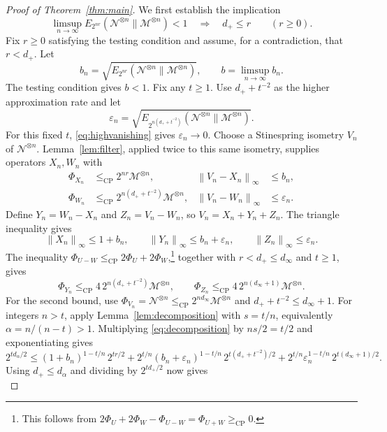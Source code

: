 \documentclass[11pt,letterpaper]{article}
\numberwithin{equation}{section}
\newcommand{\N}{\mathcal N}
\newcommand{\M}{\mathcal M}
\newcommand{\cp}{\mathrm{CP}}
\newcommand{\norm}[1]{\left\lVert#1\right\rVert}
\begin{document}
\begin{proof}[Proof of Theorem~\ref{thm:main}]
We first establish the implication
\begin{equation}\label{eq:thresholdcriterion}
 \limsup_{n\to\infty}E_{2^{nr}}(\N^{\otimes n}\|\M^{\otimes n})<1
 \quad\Longrightarrow\quad d_+\le r\qquad(r\ge0).
\end{equation}
Fix $r\ge0$ satisfying the testing condition and assume, for a contradiction, that $r<d_+$. Let
\[
 b_n=\sqrt{E_{2^{nr}}(\N^{\otimes n}\|\M^{\otimes n})},
 \qquad b=\limsup_{n\to\infty}b_n.
\]
The testing condition gives $b<1$. Fix any $t\ge1$. Use $d_++t^{-2}$ as the higher approximation rate and let
\[
 \varepsilon_n=\sqrt{E_{2^{n(d_++t^{-2})}}(\N^{\otimes n}\|\M^{\otimes n})}.
\]
For this fixed $t$, \eqref{eq:highvanishing} gives $\varepsilon_n\to0$. Choose a Stinespring isometry $V_n$ of $\N^{\otimes n}$. Lemma~\ref{lem:filter}, applied twice to this same isometry, supplies operators $X_n,W_n$ with
\begin{align}
 \Phi_{X_n}&\le_{\cp}2^{nr}\M^{\otimes n},
 &\norm{V_n-X_n}_\infty&\le b_n,\label{eq:lowapprox}\\
 \Phi_{W_n}&\le_{\cp}2^{n(d_++t^{-2})}\M^{\otimes n},
 &\norm{V_n-W_n}_\infty&\le\varepsilon_n.
 \label{eq:highapprox}
\end{align}
Define $Y_n=W_n-X_n$ and $Z_n=V_n-W_n$, so $V_n=X_n+Y_n+Z_n$. The triangle inequality gives
\[
 \norm{X_n}_\infty\le1+b_n,\qquad
 \norm{Y_n}_\infty\le b_n+\varepsilon_n,\qquad
 \norm{Z_n}_\infty\le\varepsilon_n.
\]
The inequality $\Phi_{U-W}\le_{\cp}2\Phi_U+2\Phi_W$,\footnote{This follows from $2\Phi_U+2\Phi_W-\Phi_{U-W}=\Phi_{U+W}\ge_{\cp}0$.} together with $r<d_+\le d_\infty$ and $t\ge1$, gives
\begin{equation}\label{eq:threecaps}
 \Phi_{Y_n}\le_{\cp}4\,2^{n(d_++t^{-2})}\M^{\otimes n},
 \qquad
 \Phi_{Z_n}\le_{\cp}4\,2^{n(d_\infty+1)}\M^{\otimes n}.
\end{equation}
For the second bound, use $\Phi_{V_n}=\N^{\otimes n}\le_{\cp}2^{nd_\infty}\M^{\otimes n}$ and $d_++t^{-2}\le d_\infty+1$.
For integers $n>t$, apply Lemma~\ref{lem:decomposition} with $s=t/n$, equivalently $\alpha=n/(n-t)>1$. Multiplying \eqref{eq:decomposition} by $ns/2=t/2$ and exponentiating gives
\[
 2^{td_\alpha/2}\le(1+b_n)^{1-t/n}\,2^{tr/2}
 +2^{t/n}(b_n+\varepsilon_n)^{1-t/n}\,2^{t(d_++t^{-2})/2}
 +2^{t/n}\varepsilon_n^{1-t/n}\,2^{t(d_\infty+1)/2}.
\]
Using $d_+\le d_\alpha$ and dividing by $2^{td_+/2}$ now gives
\begin{equation}\label{eq:threepiecebound}

\end{equation}
\end{proof}
\end{document}
